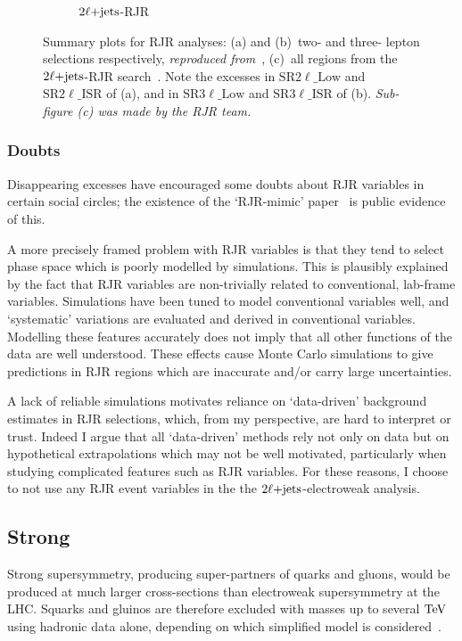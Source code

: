 \begin{figure}[tp]
\begin{subfigure}{0.8\textwidth}
    \caption{$\twoljets$-RJR~\cite{atlas2022searches}}
\end{subfigure}
\caption{%
Summary plots for RJR analyses:
(a) and (b)~two- and three- lepton selections respectively,
\emph{reproduced from}~\cite{atlas_rjr_23l_SUSY_2017_03},
(c)~all regions from the $\twoljets$-RJR search~\cite{atlas2022searches}.
Note the excesses in
$\mathrm{SR}2\ell\_\mathrm{Low}$ and $\mathrm{SR}2\ell\_\mathrm{ISR}$ of (a),
and in
$\mathrm{SR}3\ell\_\mathrm{Low}$ and $\mathrm{SR}3\ell\_\mathrm{ISR}$ of (b).
\emph{Sub-figure (c) was made by the RJR team.}
}
\label{fig:2ljets_rjr_summaries}
\end{figure}


\subsubsection{Doubts}
Disappearing excesses have encouraged some doubts about RJR variables in
certain social circles;
the existence of the `RJR-mimic' paper~\cite{atlas_rjr_mimic_SUSY_2018_06}
is public evidence of this.

A more precisely framed problem with RJR variables is that they tend to select
phase space which is poorly modelled by simulations.
This is plausibly explained by the fact that  RJR variables are non-trivially
related to conventional, lab-frame variables.
Simulations have been tuned to model conventional variables well, and
`systematic' variations are evaluated and derived in conventional variables.
Modelling these features accurately does not imply that all other functions of
the data are well understood.
These effects cause Monte Carlo simulations to give predictions in RJR regions
which are inaccurate and/or carry large uncertainties.

A lack of reliable simulations motivates reliance on `data-driven' background
estimates in RJR selections, which, from my perspective, are hard to interpret
or trust.
Indeed I argue that all `data-driven' methods rely not only on data but on
hypothetical extrapolations which may not be well motivated, particularly when
studying complicated features such as RJR variables.
For these reasons, I choose to not use any RJR event variables in the the
$\twoljets$-electroweak analysis.


\subsection{Strong}
\label{sec:2ljets_origins_strong}
Strong supersymmetry, producing super-partners of quarks and gluons, would be
produced at much larger cross-sections than electroweak supersymmetry at the
LHC.
Squarks and gluinos are therefore excluded with masses up to several
$\eV[T]$ using hadronic data alone, depending on which simplified model is
considered~\cite{atlas_susy_strong_0l}.

